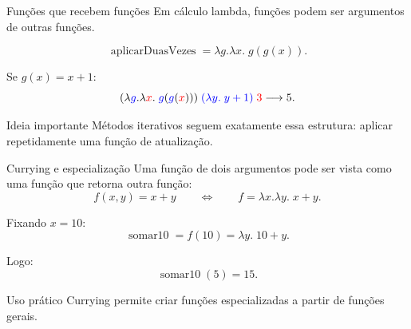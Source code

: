\documentclass[aspectratio=169,11pt]{beamer}
\begin{document}
\begin{frame}{Funções que recebem funções}
  Em cálculo lambda, funções podem ser argumentos de outras funções.

  \begin{equation*}
    \operatorname{aplicarDuasVezes}=\lambda g.\lambda x.\;g(g(x)).
  \end{equation*}

  Se $g(x)=x+1$:
  \begin{equation*}
    (\lambda \textcolor{blue}{g}.\lambda \textcolor{red}{x}.\;\textcolor{blue}{g}(\textcolor{blue}{g}(\textcolor{red}{x})))\;\textcolor{blue}{(\lambda y.\;y+1)}\;\textcolor{red}{3}
    \longrightarrow
    5.
  \end{equation*}

  \begin{block}{Ideia importante}
    Métodos iterativos seguem exatamente essa estrutura: aplicar repetidamente uma função de atualização.
  \end{block}
\end{frame}

\begin{frame}{Currying e especialização}
  Uma função de dois argumentos pode ser vista como uma função que retorna outra função:
  \begin{equation*}
    f(x,y)=x+y
    \qquad\Longleftrightarrow\qquad
    f=\lambda x.\lambda y.\;x+y.
  \end{equation*}

  Fixando $x=10$:
  \begin{equation*}
    \operatorname{somar10}=f(10)=\lambda y.\;10+y.
  \end{equation*}

  Logo:
  \begin{equation*}
    \operatorname{somar10}(5)=15.
  \end{equation*}

  \begin{block}{Uso prático}
    Currying permite criar funções especializadas a partir de funções gerais.
  \end{block}
\end{frame}
\end{document}
